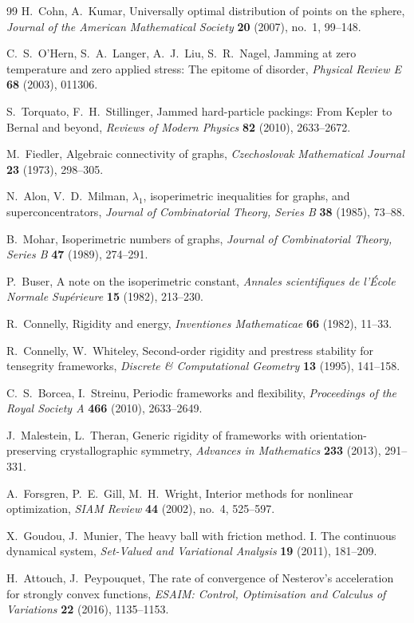\documentclass[11pt]{article}
\theoremstyle{remark}
\theoremstyle{definition}
\begin{document}
\begin{thebibliography}{99}
H.~Cohn, A.~Kumar,
Universally optimal distribution of points on the sphere,
\emph{Journal of the American Mathematical Society} \textbf{20} (2007), no.~1, 99--148.

C.~S.~O'Hern, S.~A.~Langer, A.~J.~Liu, S.~R.~Nagel,
Jamming at zero temperature and zero applied stress: The epitome of disorder,
\emph{Physical Review E} \textbf{68} (2003), 011306.

S.~Torquato, F.~H.~Stillinger,
Jammed hard-particle packings: From Kepler to Bernal and beyond,
\emph{Reviews of Modern Physics} \textbf{82} (2010), 2633--2672.

M.~Fiedler,
Algebraic connectivity of graphs,
\emph{Czechoslovak Mathematical Journal} \textbf{23} (1973), 298--305.

N.~Alon, V.~D.~Milman,
$\lambda_1$, isoperimetric inequalities for graphs, and superconcentrators,
\emph{Journal of Combinatorial Theory, Series B} \textbf{38} (1985), 73--88.

B.~Mohar,
Isoperimetric numbers of graphs,
\emph{Journal of Combinatorial Theory, Series B} \textbf{47} (1989), 274--291.

P.~Buser,
A note on the isoperimetric constant,
\emph{Annales scientifiques de l'\'Ecole Normale Sup\'erieure} \textbf{15} (1982), 213--230.

R.~Connelly,
Rigidity and energy,
\emph{Inventiones Mathematicae} \textbf{66} (1982), 11--33.

R.~Connelly, W.~Whiteley,
Second-order rigidity and prestress stability for tensegrity frameworks,
\emph{Discrete \& Computational Geometry} \textbf{13} (1995), 141--158.

C.~S.~Borcea, I.~Streinu,
Periodic frameworks and flexibility,
\emph{Proceedings of the Royal Society A} \textbf{466} (2010), 2633--2649.

J.~Malestein, L.~Theran,
Generic rigidity of frameworks with orientation-preserving crystallographic symmetry,
\emph{Advances in Mathematics} \textbf{233} (2013), 291--331.

A.~Forsgren, P.~E.~Gill, M.~H.~Wright,
Interior methods for nonlinear optimization,
\emph{SIAM Review} \textbf{44} (2002), no.~4, 525--597.

X.~Goudou, J.~Munier,
The heavy ball with friction method. I. The continuous dynamical system,
\emph{Set-Valued and Variational Analysis} \textbf{19} (2011), 181--209.

H.~Attouch, J.~Peypouquet,
The rate of convergence of Nesterov's acceleration for strongly convex functions,
\emph{ESAIM: Control, Optimisation and Calculus of Variations} \textbf{22} (2016), 1135--1153.

\end{thebibliography}
\end{document}
